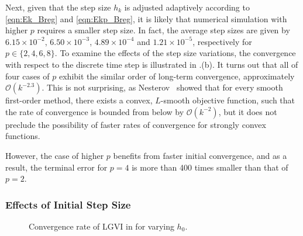 \documentclass[letterpaper, 10pt, conference]{ieeeconf}
\begin{document}
Next, given that the step size $h_k$ is adjusted adaptively according to \eqref{eqn:Ek_Breg} and \eqref{eqn:Ekp_Breg}, it is likely that numerical simulation with higher $p$ requires a smaller step size. 
In fact, the average step sizes are given by $6.15\times10^{-2}$, $6.50\times 10^{-3}$, $4.89\times10^{-4}$ and $1.21\times 10^{-5}$, respectively for $p\in\{2,4,6,8\}$. 
To examine the effects of the step size variations, the convergence with respect to the discrete time step is illustrated in .(b).
It turns out that all of four cases of $p$ exhibit the similar order of long-term convergence, approximately $\mathcal{O}(k^{-2.3})$. This is not surprising, as Nesterov~\cite{nesterov2003introductory} showed that for every smooth first-order method, there exists a convex, $L$-smooth objective function, such that the rate of convergence is bounded from below by $\mathcal{O}(k^{-2})$, but it does not preclude the possibility of faster rates of convergence for strongly convex functions.

However, the case of higher $p$ benefits from faster initial convergence, and as a result, the terminal error for $p=4$ is more than 400 times smaller than that of $p=2$.

\subsubsection{Effects of Initial Step Size}

\begin{figure}
    \centerline{
    }
    \centerline{
    }
    \caption{Convergence rate of LGVI in  for varying $h_0$.} \label{fig:conv_h}
\end{figure}
\end{document}
